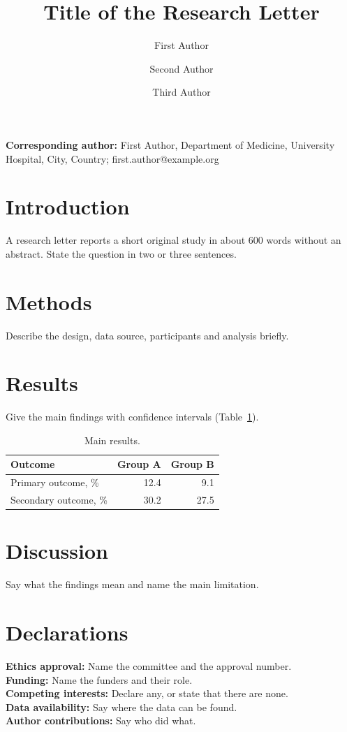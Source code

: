 \documentclass[11pt,a4paper]{article}
\title{Title of the Research Letter}
\author[1]{First Author}
\author[1,2]{Second Author}
\author[2]{Third Author}
\affil[1]{Department of Medicine, University Hospital, City, Country}
\affil[2]{School of Public Health, University, City, Country}
\date{}
\begin{document}
\maketitle

\noindent\textbf{Corresponding author:} First Author, Department of Medicine,
University Hospital, City, Country; first.author@example.org

\section*{Introduction}
A research letter reports a short original study in about 600 words without an
abstract. State the question in two or three sentences.\cite{vonelm2007strobe}

\section*{Methods}
Describe the design, data source, participants and analysis briefly.

\section*{Results}
Give the main findings with confidence intervals (Table~\ref{tab:results}).

\begin{table}[htbp]
  \centering
  \caption{Main results.}
  \label{tab:results}
  \begin{tabular}{lrr}
    \toprule
    Outcome & Group A & Group B \\
    \midrule
    Primary outcome, \% & 12.4 & 9.1 \\
    Secondary outcome, \% & 30.2 & 27.5 \\
    \bottomrule
  \end{tabular}
\end{table}

\section*{Discussion}
Say what the findings mean and name the main limitation.

\section*{Declarations}
\noindent\textbf{Ethics approval:} Name the committee and the approval number.\\
\textbf{Funding:} Name the funders and their role.\\
\textbf{Competing interests:} Declare any, or state that there are none.\\
\textbf{Data availability:} Say where the data can be found.\\
\textbf{Author contributions:} Say who did what.



\end{document}
